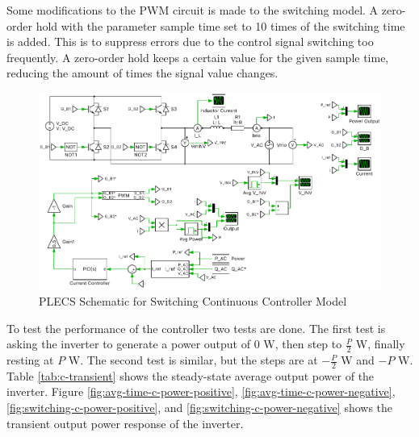 \documentclass[12pt]{article}
\begin{document}
Some modifications to the PWM circuit is made to the switching model.
A zero-order hold with the parameter sample time set to 10 times of the switching time is added.
This is to suppress errors due to the control signal switching too frequently.
A zero-order hold keeps a certain value for the given sample time, reducing the amount of times the signal value changes.

\begin{figure}[ht]
    \centering{}
    \includegraphics[width=\textwidth, height=0.4\textheight, keepaspectratio]{img/Switching C Model.pdf}
    \caption{PLECS Schematic for Switching Continuous Controller Model}
    \label{fig:switching-c-model}
\end{figure}

To test the performance of the controller two tests are done.
The first test is asking the inverter to generate a power output of 0 W, then step to $\frac{P}{2}$ W, finally resting at $P$ W.
The second test is similar, but the steps are at $-\frac{P}{2}$ W and $-P$ W.
Table \ref{tab:c-transient} shows the steady-state average output power of the inverter.
Figure \ref{fig:avg-time-c-power-positive}, \ref{fig:avg-time-c-power-negative}, \ref{fig:switching-c-power-positive}, and \ref{fig:switching-c-power-negative} shows the transient output power response of the inverter.
\end{document}
